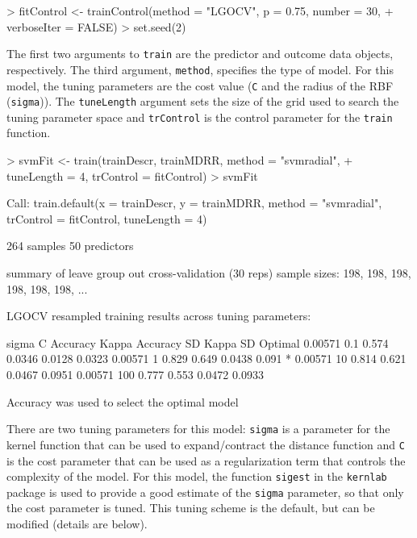 \documentclass[12pt]{article}
\begin{document}
\begin{small}
\begin{Schunk}
\begin{Sinput}
> fitControl <- trainControl(method = "LGOCV", p = 0.75, number = 30, 
+     verboseIter = FALSE)
> set.seed(2)
\end{Sinput}
\end{Schunk}
\end{small}


The first two arguments to \texttt{train} are the predictor and outcome data objects, respectively. The third argument, \texttt{method}, specifies the type of model. For this model, the tuning parameters are the cost value (\texttt{C} and the radius of the RBF (\texttt{sigma})). The \texttt{tuneLength} argument sets the size of the grid used to search the tuning parameter space and \texttt{trControl} is the control parameter for the \texttt{train} function. 

\begin{small}
\begin{Schunk}
\begin{Sinput}
> svmFit <- train(trainDescr, trainMDRR, method = "svmradial", 
+     tuneLength = 4, trControl = fitControl)
> svmFit
\end{Sinput}
\begin{Soutput}
Call:
train.default(x = trainDescr, y = trainMDRR, method = "svmradial", 
    trControl = fitControl, tuneLength = 4)

264 samples
50 predictors

summary of leave group out cross-validation (30 reps) sample sizes:
    198, 198, 198, 198, 198, 198, ... 

LGOCV resampled training results across tuning parameters:

  sigma    C    Accuracy  Kappa   Accuracy SD  Kappa SD  Optimal
  0.00571  0.1  0.574     0.0346  0.0128       0.0323           
  0.00571  1    0.829     0.649   0.0438       0.091     *      
  0.00571  10   0.814     0.621   0.0467       0.0951           
  0.00571  100  0.777     0.553   0.0472       0.0933           

Accuracy was used to select the optimal model
\end{Soutput}
\end{Schunk}
\end{small}


There are two tuning parameters for this model: \texttt{sigma} is a parameter for the kernel function that can be used to expand/contract the distance function and \texttt{C} is the cost parameter that can be used as a regularization term that controls the complexity of the model. For this model, the function \texttt{sigest} in the \texttt{kernlab} package is used to provide a good estimate of the \texttt{sigma} parameter, so that only the cost parameter is tuned. This tuning scheme is the default, but can be modified (details are below). 
\end{document}
